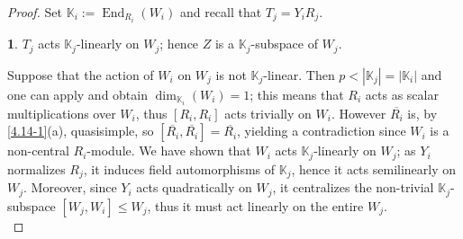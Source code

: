 \documentclass{amsart}
\numberwithin{equation}{section}
\theoremstyle{definition}
\theoremstyle{subresult}
\newtheorem{subresult}{}[equation]
\theoremstyle{caseresult}
\newcommand{\bK}{\mathbb{K}}
\newcommand{\End}{\operatorname{End}}
\newcommand{\ov}{\overline}
\newcommand{\<}{\langle}
\renewcommand{\>}{\rangle}
\begin{document}
\begin{proof}
	Set $\bK_i := \End_{R_i}(W_i)$ and recall that $T_j = Y_iR_j$.
	
	
	\begin{subresult}\label{4.14-7}
		$T_j$ acts $\bK_j$-linearly on $W_j$; hence $Z$ is a $\bK_j$-subspace of $W_j$.
	\end{subresult}
	Suppose that the action of $W_i$ on $W_j$ is not $\bK_j$-linear. Then $p < |\bK_j|=|\bK_i|$ and one can apply \cite[Lemma 1.22]{Meier-Stell-Stroth:2012} and obtain $\dim_{\bK_i}(W_i) =1$; this means that $R_i$ acts as scalar multiplications over $W_i$, thus $[R_i,R_i]$ acts trivially on $W_i$. However $\ov{R_i}$ is, by \eqref{4.14-1}(a), quasisimple, so $[\ov{R_i},\ov{R_i}]=\ov{R_i}$, yielding a contradiction since $W_i$ is a non-central $R_i$-module. We have shown that $W_i$ acts $\bK_j$-linearly on $W_j$; as $Y_i$ normalizes $R_j$, it induces field automorphisms of $\bK_j$, hence it acts semilinearly on $W_j$. Moreover, since $Y_i$ acts quadratically on $W_j$, it centralizes the non-trivial $\bK_j$-subspace $[W_j,W_i] \le W_j$, thus it must act linearly on the entire $W_j$.\\	
	

\end{proof}
\end{document}
